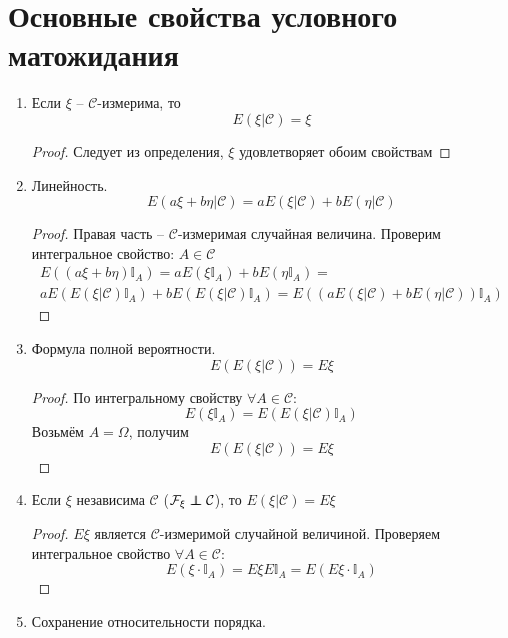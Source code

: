 \section{Основные свойства условного матожидания}
\begin{enumerate}
	\item Если $\xi$ -- $\mathcal{C}$-измерима, то
	      \[E(\xi | \mathcal{C}) = \xi\]
	      \begin{proof}
		      Следует из определения, $\xi$ удовлетворяет обоим свойствам
	      \end{proof}
	\item Линейность.
	      \[E(a\xi + b\eta | \mathcal{C}) = aE(\xi | \mathcal{C}) + bE(\eta | \mathcal{C})\]
	      \begin{proof}
		      Правая часть -- $\mathcal{C}$-измеримая случайная величина. Проверим интегральное свойство: $A \in \mathcal{C}$
		      \begin{align*}
			      E((a\xi + b\eta)\mathbb{I}_A) = aE(\xi\mathbb{I}_A) + bE(\eta\mathbb{I}_A) = \\
			      aE(E(\xi | \mathcal{C})\mathbb{I}_A) + bE(E(\xi|\mathcal{C})\mathbb{I}_A) = E((aE(\xi|\mathcal{C}) + bE(\eta|\mathcal{C}))\mathbb{I}_A)
		      \end{align*}
	      \end{proof}
	\item Формула полной вероятности.
	      \[E(E(\xi | \mathcal{C})) = E\xi\]
	      \begin{proof}
		      По интегральному свойству $\forall A \in \mathcal{C}$:
		      \[E(\xi\mathbb{I}_A) = E(E(\xi | \mathcal{C})\mathbb{I}_A)\]
		      Возьмём $A = \Omega$, получим
		      \[E(E(\xi | \mathcal{C})) = E\xi\]
	      \end{proof}
	\item Если $\xi$ независима $\mathcal{C}$ ($\mathcal{F}_\xi \independent \mathcal{C}$), то $E(\xi | \mathcal{C}) = E\xi$
	      \begin{proof}
		      $E\xi$ является $\mathcal{C}$-измеримой случайной величиной. Проверяем интегральное свойство $\forall A \in \mathcal{C}$:
		      \[E(\xi\cdot\mathbb{I}_A) = E\xi E\mathbb{I}_A = E(E\xi \cdot \mathbb{I}_A)\]
	      \end{proof}
	\item Сохранение относительности порядка.


\end{enumerate}
